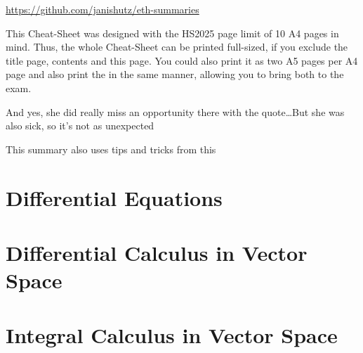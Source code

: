 \documentclass{article}
\begin{document}
\url{https://github.com/janishutz/eth-summaries}

This Cheat-Sheet was designed with the HS2025 page limit of 10 A4 pages in mind.
Thus, the whole Cheat-Sheet can be printed full-sized, if you exclude the title page, contents and this page.
You could also print it as two A5 pages per A4 page and also print the
\smallhspace in the same manner, allowing you to bring both to the exam.

And yes, she did really miss an opportunity there with the quote\dots But she was also sick, so it's not as unexpected

This summary also uses tips and tricks from this 


\newsection


\section{Differential Equations}





\newsection
\section{Differential Calculus in Vector Space}








\newsection
\section{Integral Calculus in Vector Space}





\end{document}
